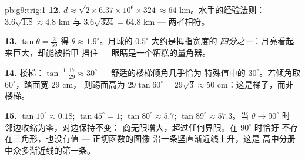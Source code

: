 \begin{solution}{pb:g9:trig:1}
\textbf{12.} $d \approx \sqrt{2 \times 6.37 \times 10^6 \times
324} \approx 64$ km。水手的经验法则：$3.6\sqrt{1.8} \approx
4.8$ km 与 $3.6\sqrt{324} = 64.8$ km --- 两者相符。

\textbf{13.} $\tan\theta = \frac{2}{60}$ 得 $\theta \approx
1.9^\circ$。月球的 $0.5^\circ$ 大约是拇指宽度的
\emph{四分之一}：月亮看起来巨大，却能被指甲
挡住 --- 眼睛是一个糟糕的量角器。

\textbf{14.} 楼梯：$\tan^{-1}\frac{17}{29} \approx 30^\circ$
--- 舒适的楼梯倾角几乎恰为
特殊值中的 $30^\circ$。若倾角取 $60^\circ$，踏面宽 $29$ cm，
则踢面高为 $29\tan 60^\circ = 29\sqrt3 \approx
50$ cm：这是梯子，而非楼梯。

\textbf{15.} $\tan 10^\circ \approx 0.18$;
$\tan 45^\circ = 1$; $\tan 80^\circ \approx 5.7$;
$\tan 89^\circ \approx 57.3$。当 $\theta \to 90^\circ$ 时
邻边收缩为零，对边保持不变：
商无限增大，超过任何界限。在 $90^\circ$ 时恰好
不存在三角形，也没有值 --- 正切函数的图像
沿一条竖直渐近线上升，这是
高中分册中众多渐近线的第一条。
\end{solution}
